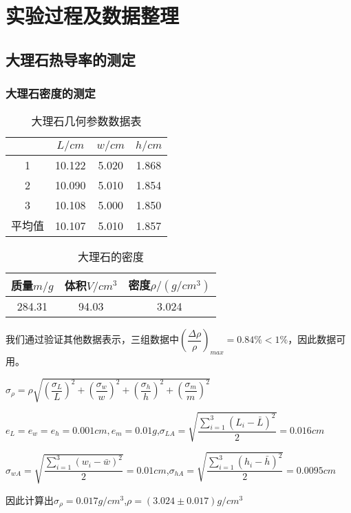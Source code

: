 \documentclass[UTF8]{ctexart}
\begin{document}
	\section{实验过程及数据整理}
	\subsection{大理石热导率的测定}
	\subsubsection{大理石密度的测定}
		\begin{table}[H]
	\centering
	\caption{大理石几何参数数据表}
	\label{大理石几何参数数据表}
	\begin{tabular}{|c|*{3}{c}|}
		\toprule[0.5mm]
		&$L/cm$&$w/cm$&$h/cm$\\
		\midrule
		1&10.122&5.020&1.868\\
		2&10.090&5.010&1.854\\
		3&10.108&5.000&1.850\\
		平均值&10.107&5.010&1.857\\
		\bottomrule[0.5mm]
	\end{tabular}
\end{table}
\begin{table}[H]
	\centering
	\caption{大理石的密度}
	\begin{tabular}{|c|c|c|}
		\toprule[0.5mm]
		质量$m/g$&体积$V/cm^{3}$&密度$\rho/(g/cm^{3})$\\
		\midrule
		284.31&94.03&3.024\\
		\bottomrule[0.5mm]
	\end{tabular}
\end{table}
我们通过验证其他数据表示，三组数据中$(\dfrac{\Delta \rho}{\rho})_{max}=0.84\%<1\%$，因此数据可用。
\par $\sigma_{\rho}=\rho\sqrt{(\dfrac{\sigma_{L}}{L})^{2}+(\dfrac{\sigma_{w}}{w})^{2}+(\dfrac{\sigma_{h}}{h})^{2}+(\dfrac{\sigma_{m}}{m})^{2}}$
\par $e_{L}=e_{w}=e_{h}=0.001cm,e_{m}=0.01g$,\quad$\sigma_{LA}=\sqrt{\dfrac{\sum\limits_{i=1}^{3}(L_{i}-\bar{L})^{2}}{2}}=0.016cm$
\par $\sigma_{wA}=\sqrt{\dfrac{\sum\limits_{i=1}^{3}(w_{i}-\bar{w})^{2}}{2}}=0.01cm$,\quad$\sigma_{hA}=\sqrt{\dfrac{\sum\limits_{i=1}^{3}(h_{i}-\bar{h})^{2}}{2}}=0.0095cm$
\par 因此计算出$\sigma_{\rho}=0.017g/cm^{3}$,\quad$\rho=(3.024\pm 0.017)g/cm^{3}$
\end{document}
